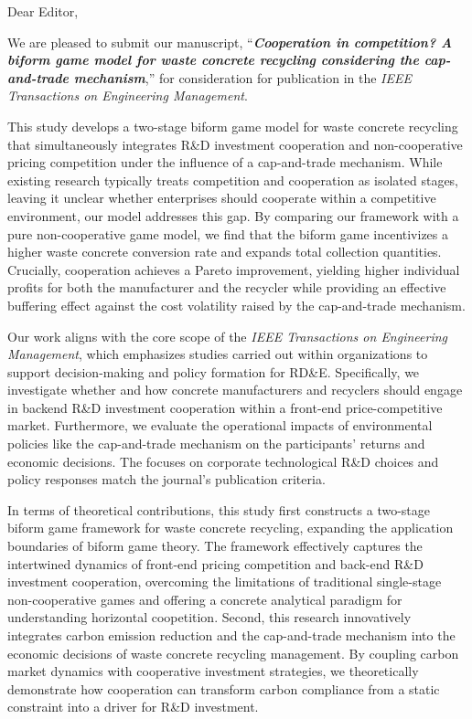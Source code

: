 \documentclass[12pt]{article}
\begin{document}
Dear Editor,

We are pleased to submit our manuscript, ``\textbf{\textit{Cooperation in competition? A biform game model for waste concrete recycling considering the cap-and-trade mechanism}},'' for consideration for publication in the \textit{IEEE Transactions on Engineering Management}.

This study develops a two-stage biform game model for waste concrete recycling that simultaneously integrates R\&D investment cooperation and non-cooperative pricing competition under the influence of a cap-and-trade mechanism. While existing research typically treats competition and cooperation as isolated stages, leaving it unclear whether enterprises should cooperate within a competitive environment, our model addresses this gap. By comparing our framework with a pure non-cooperative game model, we find that the biform game incentivizes a higher waste concrete conversion rate and expands total collection quantities. Crucially, cooperation achieves a Pareto improvement, yielding higher individual profits for both the manufacturer and the recycler while providing an effective buffering effect against the cost volatility raised by the cap-and-trade mechanism.

Our work aligns with the core scope of the \textit{IEEE Transactions on Engineering Management}, which emphasizes studies carried out within organizations to support decision-making and policy formation for RD\&E. Specifically, we investigate whether and how concrete manufacturers and recyclers should engage in backend R\&D investment cooperation within a front-end price-competitive market. Furthermore, we evaluate the operational impacts of environmental policies like the cap-and-trade mechanism on the participants' returns and economic decisions. The focuses on corporate technological R\&D choices and policy responses match the journal's publication criteria.

In terms of theoretical contributions, this study first constructs a two-stage biform game framework for waste concrete recycling, expanding the application boundaries of biform game theory. The framework effectively captures the intertwined dynamics of front-end pricing competition and back-end R\&D investment cooperation, overcoming the limitations of traditional single-stage non-cooperative games and offering a concrete analytical paradigm for understanding horizontal coopetition. Second, this research innovatively integrates carbon emission reduction and the cap-and-trade mechanism into the economic decisions of waste concrete recycling management. By coupling carbon market dynamics with cooperative investment strategies, we theoretically demonstrate how cooperation can transform carbon compliance from a static constraint into a driver for R\&D investment.
\end{document}
